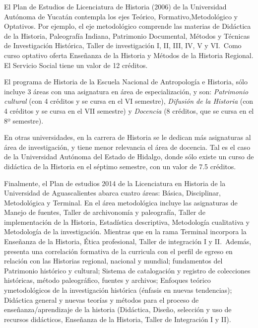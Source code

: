 El Plan de Estudios de Licenciatura de Historia (2006) de la Universidad
Autónoma de Yucatán contempla los ejes Teórico, Formativo,\linebreak Metodológico y
Optativos. Por ejemplo, el eje metodológico comprende las materias de
Didáctica de la Historia, Paleografía Indiana, Patrimonio Documental,
Métodos y Técnicas de Investigación Histórica, Taller de investigación I,
II, III, IV, V y VI.\ Como curso optativo oferta Enseñanza de la Historia y
Métodos de la Historia Regional. El Servicio Social tiene un valor de 12
créditos.

El programa de Historia de la Escuela Nacional de Antropología e Historia,
sólo incluye 3 áreas con una asignatura en área de especialización, y son:
\textit{Patrimonio cultural} (con 4 créditos y se cursa en el VI semestre),
\textit{Difusión de la Historia} (con 4 créditos y se cursa en el VII
semestre) y \textit{Docencia} (8 créditos, que se cursa en el 8º semestre).

En otras universidades, en la carrera de Historia se le dedican más asignaturas
al área de investigación, y tiene menor relevancia el área de docencia. Tal
es el caso de la Universidad Autónoma del Estado de Hidalgo, donde sólo
existe un curso de didáctica de la Historia en el séptimo semestre, con un valor 
de 7.5 créditos.

Finalmente, el Plan de estudios 2014 de la Licenciatura en Historia de la Universidad de
Aguascalientes abarca cuatro áreas: Básica, Disciplinar,
Metodológica y Terminal. En el área metodológica incluye las asignaturas de
Manejo de fuentes, Taller de archivonomía y paleografía, Taller de
implementación de la Historia, Estadística descriptiva, Metodología
cualitativa y Metodología de la investigación. Mientras que en la rama Terminal
incorpora la Enseñanza de la Historia, Ética profesional, Taller de integración
I y II.\  Además, presenta una correlación formativa de la curricula con el
perfil de egreso en relación con las Historias regional, nacional y mundial;
fundamentos del Patrimonio histórico y cultural; Sistema de catalogación y
registro de colecciones históricas, método paleográfico, fuentes y
archivos; Enfoques teórico y\linebreak metodológicos de la investigación histórica
(énfasis en nuevas tendencias); Didáctica general y nuevas teorías y
métodos para el proceso de enseñanza/aprendizaje de la historia (Didáctica,
Diseño, selección y uso de recursos didácticos, Enseñanza de la Historia,
Taller de Integración I y II).

